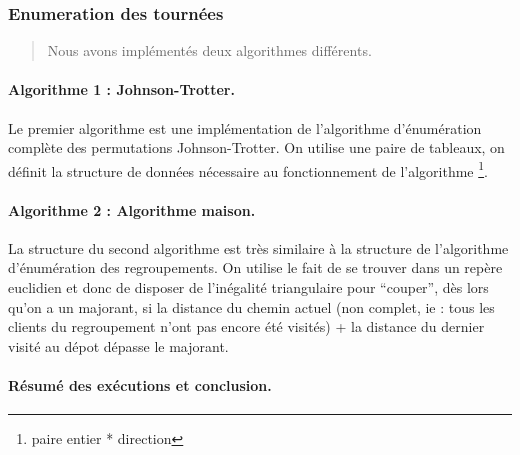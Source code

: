 \documentclass[a4paper,10pt]{article}
\begin{document}
\subsubsection{Enumeration des tournées}

\begin{quote}
  Nous avons implémentés deux algorithmes différents.
\end{quote}
\paragraph{Algorithme 1 : Johnson-Trotter.}

Le premier algorithme est une implémentation de l'algorithme d'énumération complète des permutations Johnson-Trotter.
On utilise une paire de tableaux, on définit la structure de données nécessaire au fonctionnement de l'algorithme
\footnote{paire entier * direction}.

\paragraph{Algorithme 2 : Algorithme maison.}

La structure du second algorithme est très similaire à la structure de l'algorithme d'énumération des regroupements. 
On utilise le fait de se trouver dans un repère euclidien et donc de disposer de l'inégalité triangulaire pour ``couper'',
dès lors qu'on a un majorant, si la distance du chemin actuel (non complet, ie : tous les clients du regroupement
n'ont pas encore été visités) + la distance du dernier visité au dépot dépasse le majorant.

\paragraph{Résumé des exécutions et conclusion.}
\end{document}
